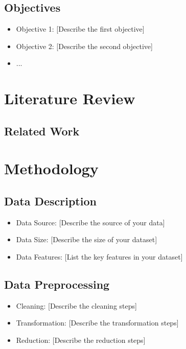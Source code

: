 \documentclass[11pt]{article}
\begin{document}
    \subsection{Objectives}
    \label{subsec:objectives}
    \begin{itemize}
        \item Objective 1: [Describe the first objective]
        \item Objective 2: [Describe the second objective]
        \item ...
    \end{itemize}

    \section{Literature Review}
    \label{sec:literature}
    \lipsum[5-6] %
    \subsection{Related Work}
    \label{subsec:related}
    \lipsum[7-8] %

    \section{Methodology}
    \label{sec:methodology}

    \subsection{Data Description}
    \label{subsec:data}
    \lipsum[9] %
    \begin{itemize}
        \item Data Source: [Describe the source of your data]
        \item Data Size: [Describe the size of your dataset]
        \item Data Features: [List the key features in your dataset]
    \end{itemize}

    \subsection{Data Preprocessing}
    \label{subsec:preprocessing}
    \lipsum[10] %
    \begin{itemize}
        \item Cleaning: [Describe the cleaning steps]
        \item Transformation: [Describe the transformation steps]
        \item Reduction: [Describe the reduction steps]
    \end{itemize}
\end{document}
